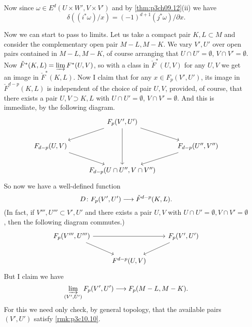 \documentclass[../main]{subfiles}
\begin{document}
Now since $\omega \in E^d(U \times W',V \times V')$ and by \ref{thm:p3ch09.12}(ii) we have
\[
	\delta((i^* \omega)/x) = (-1)^{d+1}(j^* \omega)/\partial x.
\]

Now we can start to pass to limits. Let us take a compact pair $K,L \subset M$ and consider the complementary open pair $M-L,M-K$. We vary $V',U'$ over open pairs contained in $M-L,M-K$, of course arranging that $U \cap U' = \emptyset$, $V \cap V' = \emptyset$. Now $\check{F}^*(K,L) = \varinjlim F^*(U,V)$, so with a class in $\check{F}^*(U,V)$ for any $U,V$ we get an image in $\check{F}^*(K,L)$. Now I claim that for any $x \in F_p(V',U')$, its image in $\check{F}^{d-p}(K,L)$ is independent of the choice of pair $U,V$, provided, of course, that there exists a pair $U,V \supset K,L$ with $U \cap U' = \emptyset$, $V \cap V' = \emptyset$. And this is immediate, by the following diagram.
\[
\begin{tikzcd}
                             & {F_p(V', U')} \arrow[dd] \arrow[rd] \arrow[ld] &                                  \\
{F_{d - p}(U, V)} \arrow[rd] &                                                & {F_{d - p}(U'', V'')} \arrow[ld] \\
                             & {F_{d - p}(U \cap U'', V \cap V'')}            &                                 
\end{tikzcd}
\]
So now we have a well-defined function 
\[D \colon F_p(V',U') \longrightarrow \check{F}^{d-p}(K,L).\]
(In fact, if $V''',U''' \subset V',U'$ and there exists a pair $U,V$ with $U \cap U' = \emptyset, V \cap V' = \emptyset$, then the following diagram commutes.)
\[
\begin{tikzcd}
{F_p(V''', U''')} \arrow[rr] \arrow[rd] &                   & {F_p(V', U')} \arrow[ld] \\
                                        & {F^{d - p}(U, V)} &                         
\end{tikzcd}
\]
But I claim we have
\[\varinjlim_{(V',U')} F_p(V',U') \longrightarrow F_p(M-L,M-K).\]
For this we need only check, by general topology, that the available pairs $(V',U')$ satisfy \ref{rmk:p3c10.10}.
\end{document}
